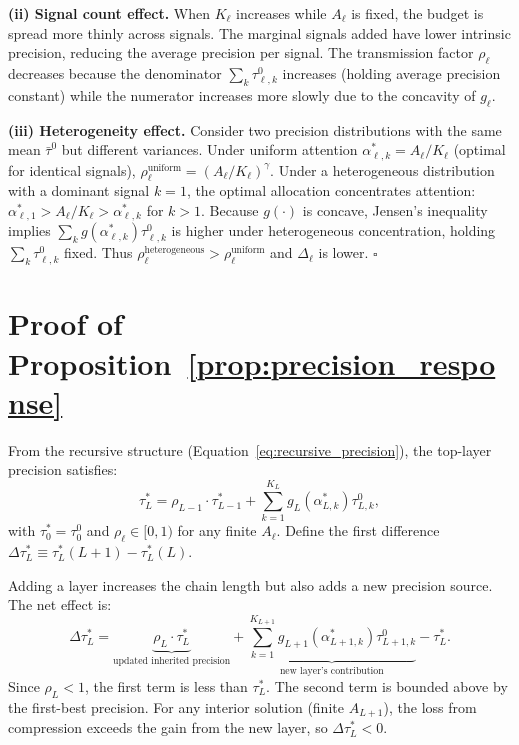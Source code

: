 \textbf{(ii) Signal count effect.} When $K_\ell$ increases while $A_\ell$ is fixed, the budget is spread more thinly across signals. The marginal signals added have lower intrinsic precision, reducing the average precision per signal. The transmission factor $\rho_\ell$ decreases because the denominator $\sum_k \tau^0_{\ell,k}$ increases (holding average precision constant) while the numerator increases more slowly due to the concavity of $g_\ell$.

\textbf{(iii) Heterogeneity effect.} Consider two precision distributions with the same mean $\bar{\tau}^0$ but different variances. Under uniform attention $\alpha^*_{\ell,k} = A_\ell/K_\ell$ (optimal for identical signals), $\rho^{\text{uniform}}_\ell = (A_\ell/K_\ell)^\gamma$. Under a heterogeneous distribution with a dominant signal $k=1$, the optimal allocation concentrates attention: $\alpha^*_{\ell,1} > A_\ell/K_\ell > \alpha^*_{\ell,k}$ for $k > 1$. Because $g(\cdot)$ is concave, Jensen's inequality implies $\sum_k g(\alpha^*_{\ell,k}) \tau^0_{\ell,k}$ is higher under heterogeneous concentration, holding $\sum_k \tau^0_{\ell,k}$ fixed. Thus $\rho^{\text{heterogeneous}}_\ell > \rho^{\text{uniform}}_\ell$ and $\Delta_\ell$ is lower. \hfill $\square$

\section{Proof of Proposition~\ref{prop:precision_response}}
\label{app:proof_prop3}

From the recursive structure (Equation~\eqref{eq:recursive_precision}), the top-layer precision satisfies:
\begin{equation*}
\tau^*_L = \rho_{L-1} \cdot \tau^*_{L-1} + \sum_{k=1}^{K_L} g_L(\alpha^*_{L,k}) \tau^0_{L,k},
\end{equation*}
with $\tau^*_0 = \tau^0_0$ and $\rho_\ell \in [0,1)$ for any finite $A_\ell$. Define the first difference $\Delta \tau^*_L \equiv \tau^*_L(L+1) - \tau^*_L(L)$.

Adding a layer increases the chain length but also adds a new precision source. The net effect is:
\begin{equation*}
\Delta \tau^*_L = \underbrace{\rho_L \cdot \tau^*_L}_{\text{updated inherited precision}} + \underbrace{\sum_{k=1}^{K_{L+1}} g_{L+1}(\alpha^*_{L+1,k}) \tau^0_{L+1,k}}_{\text{new layer's contribution}} - \tau^*_L.
\end{equation*}
Since $\rho_L < 1$, the first term is less than $\tau^*_L$. The second term is bounded above by the first-best precision. For any interior solution (finite $A_{L+1}$), the loss from compression exceeds the gain from the new layer, so $\Delta \tau^*_L < 0$.

